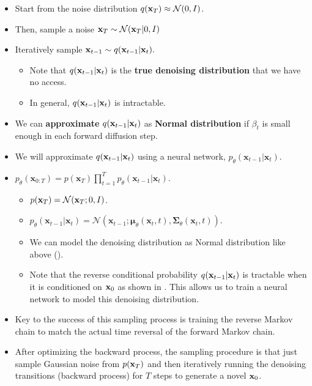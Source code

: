 \begin{itemize}
	\item Start from the noise distribution $q({\mathbf{x}}_T)\approx \mathcal{N}(0,I)$.
	\item Then, sample a noise ${\mathbf{x}}_T\sim \mathcal{N}({\mathbf{x}}_T|0,I)$
	\item Iteratively sample ${\mathbf{x}}_{t-1}\sim q({\mathbf{x}}_{t-1}|{\mathbf{x}}_t).$ 
		\begin{itemize}
			\item Note that $q({\mathbf{x}}_{t-1}|{\mathbf{x}}_t)$ is the \textbf{true denoising distribution} that we have no access.
			\item In general, $q({\mathbf{x}}_{t-1}|{\mathbf{x}}_t)$ is intractable.
		\end{itemize}
	\item We can \textbf{approximate} $q({\mathbf{x}}_{t-1}|{\mathbf{x}}_t)$ as \textbf{Normal distribution} if $\beta_t$ is small enough in each forward diffusion step.
	\item We will approximate $q({\mathbf{x}}_{t-1}|{\mathbf{x}}_t)$ using a neural network, $p_\theta(\mathbf{x}_{t-1} \vert \mathbf{x}_t)$.
	\item $p_\theta(\mathbf{x}_{0:T}) = p(\mathbf{x}_T) \prod^T_{t=1} p_\theta(\mathbf{x}_{t-1} \vert \mathbf{x}_t)$.
		\begin{itemize}
			\item $p({\mathbf{x}}_T) = \mathcal{N}({\mathbf{x}}_T;0,I)$.
			\item $p_\theta(\mathbf{x}_{t-1} \vert \mathbf{x}_t) = \mathcal{N}(\mathbf{x}_{t-1}; \boldsymbol{\mu}_\theta(\mathbf{x}_t, t), \boldsymbol{\Sigma}_\theta(\mathbf{x}_t, t))$.  

			\item We can model the denoising distribution as Normal distribution like above (\cf {}).
			\item Note that the reverse conditional probability $q({\mathbf{x}}_{t-1}|{\mathbf{x}}_t)$ is tractable when it is conditioned on ${\mathbf{x}}_0$ as shown in . This allows us to train a neural network to model this denoising distribution. 
		\end{itemize}
	\item Key to the success of this sampling process is training the reverse Markov chain to match the actual time reversal of the forward Markov chain. 
	\item After optimizing the backward process, the sampling procedure is that just sample Gaussian noise from $p({\mathbf{x}}_T)$ and then iteratively running the denoising transitions (backward process) for $T$ steps to generate a novel ${\mathbf{x}}_0$.
\end{itemize}


